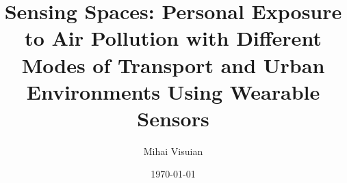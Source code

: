 \documentclass[bsc,frontabs,twoside,singlespacing, parskip,deptreport]{infthesis}     %
\begin{document}
\title{Sensing Spaces: Personal Exposure to Air Pollution with Different Modes of Transport and Urban Environments Using Wearable Sensors}

\author{Mihai Visuian}



\date{\today}
\end{document}
